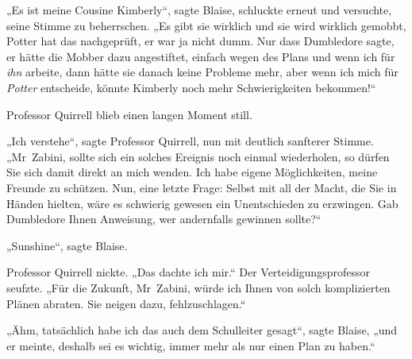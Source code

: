 „Es ist meine Cousine Kimberly“, sagte Blaise, schluckte erneut und versuchte, seine Stimme zu beherrschen.
„Es gibt sie wirklich und sie wird wirklich gemobbt, Potter hat das nachgeprüft, er war ja nicht dumm. Nur dass Dumbledore sagte, er hätte die Mobber dazu angestiftet, einfach wegen des Plans und wenn ich für \emph{ihn} arbeite, dann hätte sie danach keine Probleme mehr, aber wenn ich mich für \emph{Potter} entscheide, könnte Kimberly noch mehr Schwierigkeiten bekommen!“

Professor Quirrell blieb einen langen Moment still.

„Ich verstehe“, sagte Professor Quirrell, nun mit deutlich sanfterer Stimme.
„Mr~Zabini, sollte sich ein solches Ereignis noch einmal wiederholen, so dürfen Sie sich damit direkt an mich wenden. Ich habe eigene Möglichkeiten, meine Freunde zu schützen. Nun, eine letzte Frage: Selbst mit all der Macht, die Sie in Händen hielten, wäre es schwierig gewesen ein Unentschieden zu erzwingen. Gab Dumbledore Ihnen Anweisung, wer andernfalls gewinnen sollte?“

„Sunshine“, sagte Blaise.

Professor Quirrell nickte.
„Das dachte ich mir.“ Der Verteidigungsprofessor seufzte.
„Für die Zukunft, Mr~Zabini, würde ich Ihnen von solch komplizierten Plänen abraten. Sie neigen dazu, fehlzuschlagen.“

„Ähm, tatsächlich habe ich das auch dem Schulleiter gesagt“, sagte Blaise, „und er meinte, deshalb sei es wichtig, immer mehr als nur einen Plan zu haben.“

